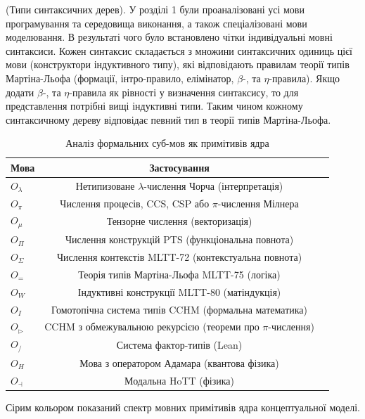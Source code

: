 \begin{definition} (Типи синтаксичних дерев).
У розділі 1 були проаналізовані усі мови програмування та середовища виконання,
а також спеціалізовані мови моделювання. В результаті чого було встановлено
чітки індивідуальні мовні синтаксиси. Кожен синтаксис складається з
множини синтаксичних одиниць цієї мови (конструктори індуктивного типу),
які відповідають правилам теорії типів Мартіна-Льофа (формації, інтро-правило,
елімінатор, $\beta$-, та $\eta$-правила). Якщо додати $\beta$-, та $\eta$-правила
як рівності у визначення синтаксису, то для представлення потрібні вищі індуктивні типи.
Таким чином кожному синтаксичному дереву відповідає певний тип в теорії типів Мартіна-Льофа.
\begin{table}
  \caption{Аналіз формальних суб-мов як примітивів ядра}
 \begin{tabular}{lcc}
    \hline
       \textbf{Мова} & \textbf{Застосування} \\
    \hline
       $O_\lambda$                     & Нетипизоване $\lambda$-числення Чорча (інтерпретація) \\
       $O_\pi$                         & Числення процесів, CCS, CSP або $\pi$-числення Мілнера\\
       $O_\mu$                         & Тензорне числення (векторизація) \\
    \hline
       $O_\Pi$                         & Числення конструкцій PTS (функціональна повнота) \\
       $O_\Sigma$                      & Числення контекстів MLTT-72 (контекстуальна повнота) \\
       $O_=$                           & Теорія типів Мартіна-Льофа MLTT-75 (логіка) \\
       $O_W$                           & Індуктивні конструкції MLTT-80 (матіндукція) \\
       $O_{I}$                         & Гомотопічна система типів CCHM (формальна математика) \\
      \hline
       $O_{\triangleright}$            & CCHM з обмежувальною рекурсією (теореми про $\pi$-числення)\\
       $O_{/}$                         & Система фактор-типів (Lean) \\
       $O_{H}$                         & Мова з оператором Адамара (квантова фізика)\\
       $O_{\dashv}$                    & Модальна HoTT (фізика)\\
      \hline
  \end{tabular}
  \small Сірим кольором показаний спектр мовних примітивів ядра концептуальної моделі.
\end{table}
\end{definition}

